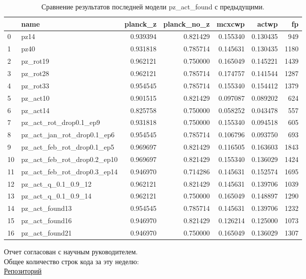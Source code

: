 \documentclass{article}
\begin{document}
\begin{table}
\begin{tabular}{llrrrrr}
\toprule
{} &                         name &  planck\_z &  planck\_no\_z &    mcxcwp &     actwp &    fp \\
\midrule
0  &                         pz14 &  0.939394 &     0.821429 &  0.155340 &  0.130435 &   949 \\
1  &                         pz40 &  0.931818 &     0.785714 &  0.145631 &  0.130435 &  1180 \\
2  &                     pz\_rot19 &  0.962121 &     0.750000 &  0.165049 &  0.145221 &  1439 \\
3  &                     pz\_rot28 &  0.962121 &     0.785714 &  0.174757 &  0.141544 &  1287 \\
4  &                     pz\_rot33 &  0.954545 &     0.785714 &  0.155340 &  0.154412 &  1379 \\
5  &                     pz\_act10 &  0.901515 &     0.821429 &  0.097087 &  0.089202 &   624 \\
6  &                     pz\_act14 &  0.825758 &     0.750000 &  0.058252 &  0.043478 &   557 \\
7  &       pz\_act\_rot\_drop0.1\_ep9 &  0.931818 &     0.750000 &  0.155340 &  0.094518 &   605 \\
8  &   pz\_act\_jan\_rot\_drop0.1\_ep6 &  0.954545 &     0.785714 &  0.106796 &  0.093750 &   693 \\
9  &   pz\_act\_feb\_rot\_drop0.1\_ep5 &  0.969697 &     0.821429 &  0.116505 &  0.163603 &  1843 \\
10 &  pz\_act\_feb\_rot\_drop0.2\_ep10 &  0.969697 &     0.821429 &  0.155340 &  0.136029 &  1424 \\
11 &  pz\_act\_feb\_rot\_drop0.3\_ep14 &  0.946970 &     0.714286 &  0.145631 &  0.152574 &  1695 \\
12 &          pz\_act\_q\_0.1\_0.9\_12 &  0.962121 &     0.821429 &  0.145631 &  0.139706 &  1039 \\
13 &          pz\_act\_q\_0.1\_0.9\_14 &  0.962121 &     0.750000 &  0.165049 &  0.148897 &  1290 \\
14 &               pz\_act\_found13 &  0.954545 &     0.785714 &  0.145631 &  0.139706 &  1232 \\
15 &               pz\_act\_found16 &  0.946970 &     0.821429 &  0.126214 &  0.125000 &  1073 \\
16 &               pz\_act\_found21 &  0.946970 &     0.750000 &  0.165049 &  0.136029 &  1307 \\
\bottomrule
\end{tabular}
\caption{Сравнение результатов последней модели pz\_act\_found с предыдущими.}
\end{table}

Отчет согласован с научным руководителем.\\
Общее количество строк кода за эту неделю: \\
\href{https://github.com/rt2122/data-segmentation-2}{Репозиторий}\\ 
\end{document}
